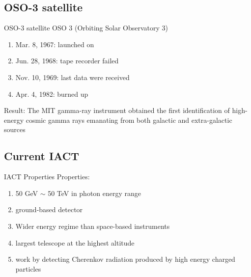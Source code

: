 \documentclass{beamer}
\begin{document}
\subsection{OSO-3 satellite}
\begin{frame}{OSO-3 satellite}
	OSO 3 (Orbiting Solar Observatory 3)
	\begin{enumerate}
		\item Mar. 8, 1967: launched on
		\item Jun. 28, 1968: tape recorder failed
		\item Nov. 10, 1969: last data were received
		\item Apr. 4, 1982: burned up
	\end{enumerate}
	Result:
	\newline
	The MIT gamma-ray instrument obtained the first identification of high-energy cosmic gamma rays emanating from both galactic and extra-galactic sources
\end{frame}



\subsection{Current IACT}
\begin{frame}{IACT Properties}
	Properties:
	\begin{enumerate}
		\item 50 GeV $\sim$ 50 TeV in photon energy range
		\item ground-based detector
		\item Wider energy regime than space-based instruments
		\item largest telescope at the highest altitude
		\item work by detecting Cherenkov radiation produced by high energy charged particles
	\end{enumerate}
\end{frame}
\end{document}
